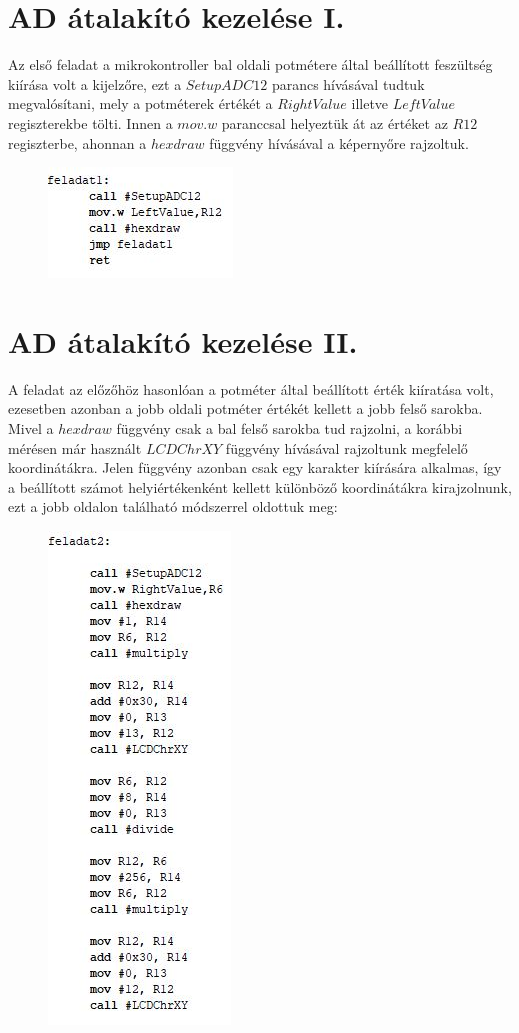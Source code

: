 \documentclass[10pt, conference, a4paper]{ITKproc}
\begin{document}
\section{AD átalakító kezelése I.}
Az első feladat a mikrokontroller bal oldali potmétere által beállított feszültség kiírása volt a kijelzőre, ezt a $SetupADC12$ parancs hívásával tudtuk megvalósítani, mely a potméterek értékét a $RightValue$ illetve $LeftValue$ regiszterekbe tölti. Innen a $mov.w$ paranccsal helyeztük át az értéket az $R12$ regiszterbe, ahonnan a $hexdraw$ függvény hívásával a képernyőre rajzoltuk. 


\begin{figure}[h]
\includegraphics[scale=0.65]{1feladat}
\centering
\end{figure}

\section{AD átalakító kezelése II.}
A feladat az előzőhöz hasonlóan a potméter által beállított érték kiíratása volt, ezesetben azonban a jobb oldali potméter értékét kellett a jobb felső sarokba. Mivel a $hexdraw$ függvény csak a bal felső sarokba tud rajzolni, a korábbi mérésen már használt $LCDChrXY$ függvény hívásával rajzoltunk megfelelő koordinátákra. Jelen függvény azonban csak egy karakter kiírására alkalmas, így a beállított számot helyiértékenként kellett különböző koordinátákra kirajzolnunk, ezt a jobb oldalon található módszerrel oldottuk meg:


\begin{figure}[h]
\includegraphics[scale=0.65]{2feladat_01}
\centering
\end{figure}
\end{document}

